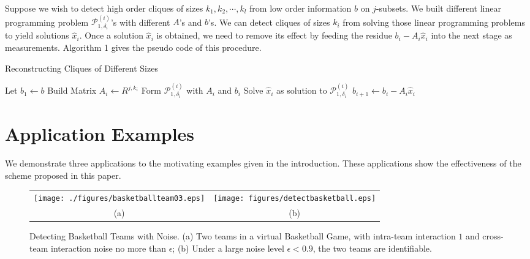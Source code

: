\documentclass{article}
\begin{document}
Suppose we wish to detect high order cliques of sizes $k_1, k_2, \cdots, k_l$ from low order information $b$ on $j$-subsets. We built different linear programming problem $\mathcal{P}^{(i)}_{1,\delta_i}$'s with different $A$'s and $b$'s. We can detect cliques of sizes $k_i$ from solving those linear programming problems to yield solutions $\hat{x}_i$. Once a solution $\hat{x}_i$  is obtained, we need to 
remove its effect by feeding the residue $b_i -A_i \hat{x}_i$ into the next stage as measurements. Algorithm 1 gives the pseudo code of this procedure. 

\begin{algorithm}
\caption{Reconstructing Cliques of Different Sizes}
\label{alg1}
\begin{algorithmic}
\STATE Let $b_1\leftarrow b$
\STATE Build Matrix $A_i\leftarrow R^{j,k_i}$
\STATE Form $\mathcal{P}^{(i)}_{1,\delta_i}$ with $A_i$ and $b_i$
\STATE Solve $\hat{x}_i$ as solution to $\mathcal{P}^{(i)}_{1,\delta_i}$
\STATE $b_{i+1}\leftarrow b_i-A_i\hat{x}_i$
\ENDFOR
\end{algorithmic}
\end{algorithm}


\section{Application Examples}
We demonstrate three applications to the motivating examples given in the introduction. These applications show the effectiveness of the scheme proposed in this paper.

 \begin{figure}[t]
\begin{center}
\begin{tabular}{cc}
\texttt{[image: ./figures/basketballteam03.eps]} & \texttt{[image: figures/detectbasketball.eps]} \\
(a) & (b) 
\end{tabular}
\caption{ \label{fig:Basketball}Detecting Basketball Teams with Noise. (a) Two teams in a virtual Basketball Game, with intra-team interaction $1$ and cross-team interaction noise no more than $\epsilon$;  (b) Under a large noise level $\epsilon<0.9$, the two teams are identifiable.}
\end{center}
\end{figure}
\end{document}
